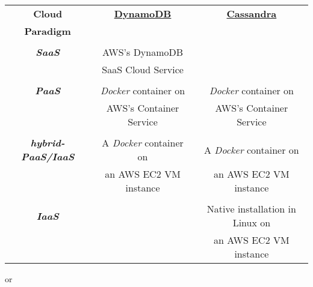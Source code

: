 \documentclass{article}[12pt]
\numberwithin{equation}{section}
\begin{document}
\begin{center}
	\vspace{-0.20in}
	\begin{spacing}{1.5}
	\begin{tabular}{c || c | c}
		\textbf{Cloud} & \textbf{\underline{DynamoDB}} & \textbf{\underline{Cassandra}} \\
		\textbf{Paradigm} & & \\
		\hline
		\hline
		 & & \\
		\textbf{\emph{SaaS}} & AWS's DynamoDB &  \\
		 & SaaS Cloud Service & \\
		\hline
		 & & \\
		\textbf{\emph{PaaS}} & \emph{Docker} container on & \emph{Docker} container on \\
		 & AWS's Container Service & AWS's Container Service \\
		\hline
		 & & \\
		\textbf{\emph{hybrid-PaaS/IaaS}} & A \emph{Docker} container on & A \emph{Docker} container on \\
		 & an AWS EC2 VM instance & an AWS EC2 VM instance \\ 
		\hline
		 & & \\
		\textbf{\emph{IaaS}} &  & Native installation in Linux on \\
		 &  & an AWS EC2 VM instance
	\end{tabular}
	
	or 
	

\end{spacing}
\end{center}
\end{document}
